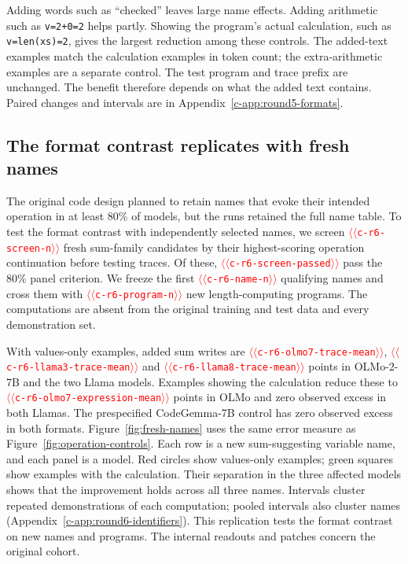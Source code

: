\documentclass[11pt]{article}
\providecommand{\NUM}[1]{\textcolor{red}{$\langle\langle$\texttt{#1}$\rangle\rangle$}}
\begin{document}
Adding words such as ``checked'' leaves large name effects. Adding arithmetic
such as \texttt{v=2+0=2} helps partly. Showing the
program's actual calculation, such as \texttt{v=len(xs)=2}, gives the
largest reduction among these controls. The added-text examples match the
calculation examples in token count; the extra-arithmetic examples are a separate
control. The test program and trace prefix are unchanged. The
benefit therefore depends on what the added text contains. Paired changes and
intervals are in Appendix~\ref{c-app:round5-formats}.

\subsection{The format contrast replicates with fresh names}
\label{sec:replication}

The original code design planned to retain names that evoke their intended
operation in at least 80\% of models, but the runs retained the full name table.
To test the format contrast with independently selected names, we screen
\NUM{c-r6-screen-n} fresh sum-family candidates by their
highest-scoring operation continuation before testing traces. Of these,
\NUM{c-r6-screen-passed} pass the 80\% panel criterion. We freeze the first
\NUM{c-r6-name-n} qualifying names and cross them with
\NUM{c-r6-program-n} new length-computing programs. The computations are absent
from the original training and test data and every demonstration set.

With values-only examples, added sum writes are
\NUM{c-r6-olmo7-trace-mean}, \NUM{c-r6-llama3-trace-mean}
and \NUM{c-r6-llama8-trace-mean}
points in OLMo-2-7B and the two Llama models. Examples showing the calculation reduce
these to \NUM{c-r6-olmo7-expression-mean} points in OLMo and zero observed excess
in both Llamas. The prespecified CodeGemma-7B control has zero observed excess
in both formats. Figure~\ref{fig:fresh-names} uses the same error measure as
Figure~\ref{fig:operation-controls}. Each row is a new sum-suggesting variable
name, and each panel is a model. Red circles show values-only examples; green
squares show examples with the calculation. Their separation in the three
affected models shows that the improvement holds across all three names.
Intervals cluster repeated demonstrations of each computation;
pooled intervals also cluster names (Appendix~\ref{c-app:round6-identifiers}).
This replication tests the format contrast on new names and programs. The
internal readouts and patches concern the original cohort.
\end{document}
